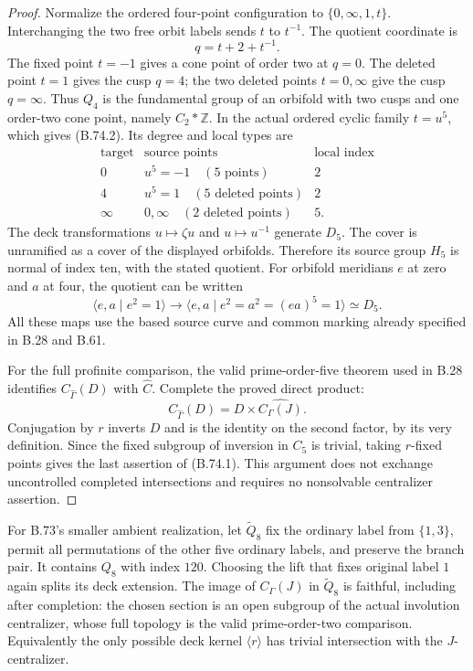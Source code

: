 \begin{proof}
Normalize the ordered four-point configuration to
\(\{0,\infty,1,t\}\).
Interchanging the two free orbit labels sends \(t\)
to \(t^{-1}\).  The quotient coordinate is
\[
                         q=t+2+t^{-1}.                         \tag{B.74.6}
\]
The fixed point \(t=-1\) gives a cone point of order
two at \(q=0\).
The deleted point \(t=1\) gives the cusp \(q=4\);
the two deleted points \(t=0,\infty\) give the cusp
\(q=\infty\).
Thus \(Q_4\) is the fundamental group of an orbifold
with two cusps and one order-two cone point, namely
\(C_2*\mathbb Z\).
In the actual ordered cyclic family \(t=u^5\),
which gives (B.74.2).
Its degree and local types are
\[
\begin{array}{c|c|c}
\text{target}&\text{source points}&\text{local index}\\\hline
0&u^5=-1\quad(5\text{ points})&2\\
4&u^5=1\quad(5\text{ deleted points})&2\\
\infty&0,\infty\quad(2\text{ deleted points})&5 .
\end{array}                                                     \tag{B.74.7}
\]
The deck transformations \(u\mapsto\zeta u\) and
\(u\mapsto u^{-1}\) generate \(D_5\).
The cover is unramified as a cover of the displayed
orbifolds.  Therefore its source group \(H_5\)
is normal of index ten, with the stated quotient.
For orbifold meridians \(e\) at zero and \(a\) at four,
the quotient can be written
\[
 \langle e,a\mid e^2=1\rangle
       \longrightarrow
 \langle e,a\mid e^2=a^2=(ea)^5=1\rangle\simeq D_5.              \tag{B.74.8}
\]
All these maps use the based source curve and common
marking already specified in B.28 and B.61.

For the full profinite comparison, the valid
prime-order-five theorem used in B.28 identifies
\(C_{\widehat\Gamma}(D)\) with \(\widehat C\).
Complete the proved direct product:
\[
          C_{\widehat\Gamma}(D)
                    =D\times\widehat{C_\Gamma(J)}.
\]
Conjugation by \(r\) inverts \(D\) and is the identity
on the second factor, by its very definition.
Since the fixed subgroup of inversion in \(C_5\)
is trivial, taking \(r\)-fixed points gives the
last assertion of (B.74.1).
This argument does not exchange uncontrolled
completed intersections and requires no
nonsolvable centralizer assertion.
\end{proof}

For B.73's smaller ambient realization, let
\(\widetilde Q_8\) fix the ordinary label from
\(\{1,3\}\), permit all permutations of the other
five ordinary labels, and preserve the branch pair.
It contains \(Q_8\) with index \(120\).
Choosing the lift that fixes original label \(1\)
again splits its deck extension.
The image of \(C_\Gamma(J)\) in
\(\widetilde Q_8\) is faithful, including after
completion: the chosen section is an open subgroup
of the actual involution centralizer, whose full
topology is the valid prime-order-two comparison.
Equivalently the only possible deck kernel
\(\langle r\rangle\) has trivial intersection with
the \(J\)-centralizer.

